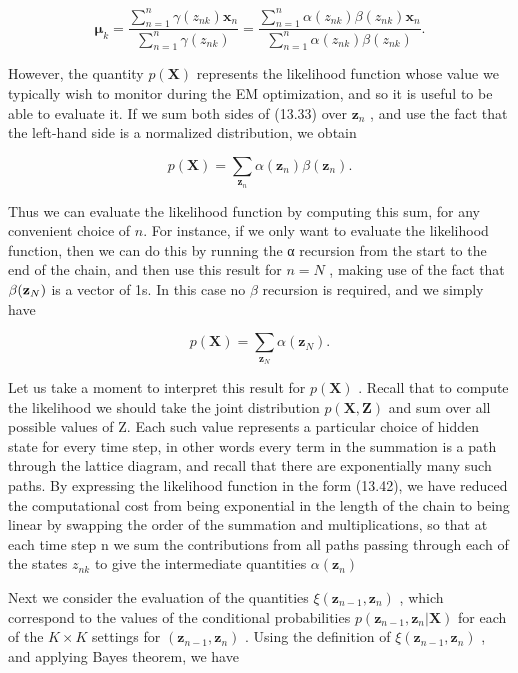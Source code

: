 \documentclass[
  10
]{article}
\begin{document}
\[
\boldsymbol {\mu} _ {k} = \frac {\sum_ {n = 1} ^ {n} \gamma (z _ {n k}) \mathbf {x} _ {n}}{\sum_ {n = 1} ^ {n} \gamma (z _ {n k})} = \frac {\sum_ {n = 1} ^ {n} \alpha (z _ {n k}) \beta (z _ {n k}) \mathbf {x} _ {n}}{\sum_ {n = 1} ^ {n} \alpha (z _ {n k}) \beta (z _ {n k})}.\tag{13.40}
\]

However, the quantity \(p ( \mathbf { X } )\) represents the likelihood
function whose value we typically wish to monitor during the EM
optimization, and so it is useful to be able to evaluate it. If we sum
both sides of (13.33) over \(\mathbf { z } _ { n }\) , and use the fact
that the left-hand side is a normalized distribution, we obtain

\[
p (\mathbf {X}) = \sum_ {\mathbf {z} _ {n}} \alpha (\mathbf {z} _ {n}) \beta (\mathbf {z} _ {n}).\tag{13.41}
\]

Thus we can evaluate the likelihood function by computing this sum, for
any convenient choice of \(n .\) For instance, if we only want to
evaluate the likelihood function, then we can do this by running the α
recursion from the start to the end of the chain, and then use this
result for \(n = N\) , making use of the fact that
\(\beta ( { \bf z } _ { N } )\) is a vector of 1s. In this case no
\(\beta\) recursion is required, and we simply have

\[
p (\mathbf {X}) = \sum_ {\mathbf {z} _ {N}} \alpha (\mathbf {z} _ {N}).\tag{13.42}
\]

Let us take a moment to interpret this result for
\(p ( \mathbf { X } )\) . Recall that to compute the likelihood we
should take the joint distribution
\(p ( \mathbf { X } , \mathbf { Z } )\) and sum over all possible values
of Z. Each such value represents a particular choice of hidden state for
every time step, in other words every term in the summation is a path
through the lattice diagram, and recall that there are exponentially
many such paths. By expressing the likelihood function in the form
(13.42), we have reduced the computational cost from being exponential
in the length of the chain to being linear by swapping the order of the
summation and multiplications, so that at each time step n we sum the
contributions from all paths passing through each of the states
\(z _ { n k }\) to give the intermediate quantities
\(\alpha ( { \mathbf z } _ { n } )\)

Next we consider the evaluation of the quantities
\(\xi ( \mathbf { z } _ { n - 1 } , \mathbf { z } _ { n } )\) , which
correspond to the values of the conditional probabilities
\(p ( \mathbf { z } _ { n - 1 } , \mathbf { z } _ { n } | \mathbf { X } )\)
for each of the \(K \times K\) settings for
\(\left( \mathbf { z } _ { n - 1 } , \mathbf { z } _ { n } \right)\) .
Using the definition of
\(\xi ( \mathbf { z } _ { n - 1 } , \mathbf { z } _ { n } )\) , and
applying Bayes theorem, we have
\end{document}
